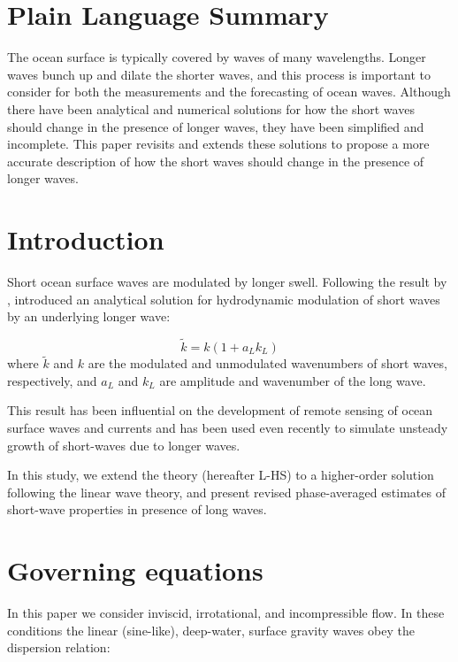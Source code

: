 \documentclass[draft]{agujournal2019}
\begin{document}
\section*{Plain Language Summary}
The ocean surface is typically covered by waves of many wavelengths.
Longer waves bunch up and dilate the shorter waves, and this process is
important to consider for both the measurements and the forecasting of ocean
waves.
Although there have been analytical and numerical solutions for how the short
waves should change in the presence of longer waves, they have been simplified
and incomplete.
This paper revisits and extends these solutions to propose a more accurate
description of how the short waves should change in the presence of longer
waves.
\section{Introduction}

Short ocean surface waves are modulated by longer swell.
Following the result by ,
 introduced an analytical solution for hydrodynamic
modulation of short waves by an underlying longer wave:

\begin{equation}
\label{eq:tau}
\widetilde{k} = k (1 + a_L k_L)
\end{equation}
where $\widetilde{k}$ and $k$ are the modulated and unmodulated wavenumbers of
short waves, respectively, and $a_L$ and $k_L$ are amplitude and wavenumber
of the long wave.

This result has been influential on the development of remote sensing of ocean
surface waves and currents \cite{keller1975microwave,hara1994hydrodynamic}
and has been used even recently \cite{peureux2021unsteady} to simulate
unsteady growth of short-waves due to longer waves.

In this study, we extend the  theory (hereafter L-HS)
to a higher-order solution following the linear wave theory, and present revised
phase-averaged estimates of short-wave properties in presence of long waves. 

\section{Governing equations}

In this paper we consider inviscid, irrotational, and incompressible flow.
In these conditions the linear (sine-like), deep-water, surface gravity waves
obey the dispersion relation:
\end{document}

